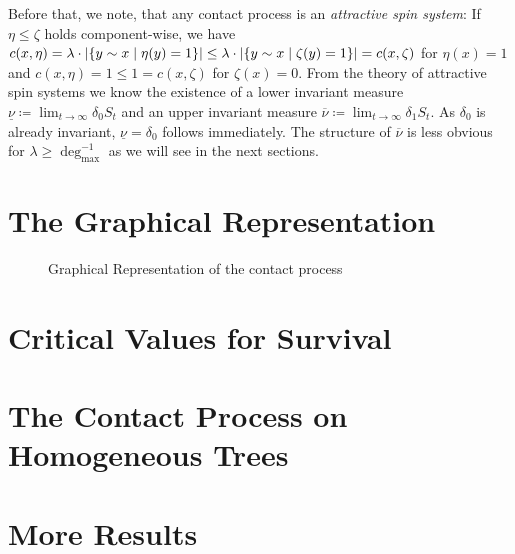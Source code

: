 \documentclass[a4paper,11pt]{amsart}
\DeclarePairedDelimiter\abs{\lvert}{\rvert}%
\begin{document}
Before that, we note, that any contact process is an \emph{attractive spin system}: If $\eta \leq \zeta$ holds component-wise, we have $c(x,\eta) = \lambda \cdot \abs{ \{ y\sim x\mid \eta(y) = 1 \}}\leq \lambda \cdot \abs{\{ y\sim x\mid \zeta(y) = 1 \}} = c(x,\zeta)$ for $\eta(x) = 1$ and $c(x, \eta) = 1 \leq 1 = c(x,\zeta)$ for $\zeta(x)=0$.
From the theory of attractive spin systems we know the existence of a lower invariant measure $\underline{\nu}\coloneqq \lim_{t\to\infty} \delta_0 S_t$
and an upper invariant measure $\overline{\nu} \coloneqq \lim_{t\to\infty} \delta_1 S_t$.
As $\delta_0$ is already invariant, $\underline{\nu} = \delta_0$ follows immediately.
The structure of $\overline{\nu}$ is less obvious for $\lambda \geq \deg_{\max}^{-1}$ as we will see in the next sections.


\section{The Graphical Representation}
\begin{figure}\label{fig:graphical-rep}
\caption{Graphical Representation of the contact process}
\vspace{1em}

\end{figure}

\section{Critical Values for Survival}



\section{The Contact Process on Homogeneous Trees}


\section{More Results}
\end{document}
